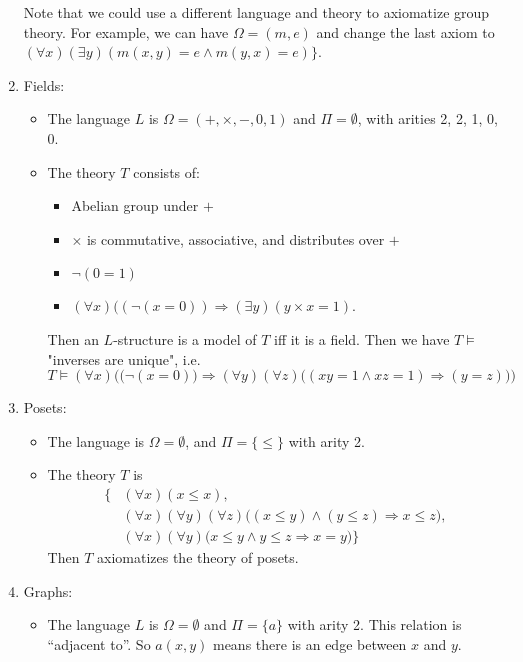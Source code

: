 \documentclass[a4paper]{article}
\begin{document}
\begin{eg}
\begin{enumerate}
     Note that we could use a different language and theory to axiomatize group theory. For example, we can have $\Omega = (m, e)$ and change the last axiom to $(\forall x)(\exists y)(m(x, y) = e\wedge m(y, x) = e)\}$.
  \item Fields:
    \begin{itemize}
      \item The language $L$ is $\Omega = (+, \times, -, 0, 1)$ and $\Pi = \emptyset$, with arities 2, 2, 1, 0, 0.
      \item The theory $T$ consists of:
        \begin{itemize}
          \item Abelian group under $+$
          \item $\times$ is commutative, associative, and distributes over $+$
          \item $\neg (0 = 1)$
          \item $(\forall x)((\neg(x = 0)) \Rightarrow (\exists y)(y\times x = 1)$.
        \end{itemize}
        Then an $L$-structure is a model of $T$ iff it is a field. Then we have $T\models$ "inverses are unique", i.e.
        \[
          T\models (\forall x)\Big(\big(\neg(x = 0)\big) \Rightarrow (\forall y)(\forall z)\big((xy = 1 \wedge xz = 1)\Rightarrow (y = z)\big)\Big)
        \]
    \end{itemize}
  \item Posets:
    \begin{itemize}
      \item The language is $\Omega = \emptyset$, and $\Pi=\{\leq\}$ with arity 2.
      \item The theory $T$ is
        \begin{align*}
          \{& (\forall x)(x \leq x),\\
            & (\forall x)(\forall y)(\forall z)\big((x \leq y)\wedge(y \leq z) \Rightarrow x \leq z\big),\\
          & (\forall x)(\forall y)\big(x \leq y \wedge y \leq z \Rightarrow x = y\big)\}
        \end{align*}
        Then $T$ axiomatizes the theory of posets.
    \end{itemize}
  \item Graphs:
    \begin{itemize}
      \item The language $L$ is $\Omega = \emptyset$ and $\Pi = \{a\}$ with arity 2. This relation is ``adjacent to''. So $a(x, y)$ means there is an edge between $x$ and $y$.

\end{itemize}
\end{enumerate}
\end{eg}
\end{document}
